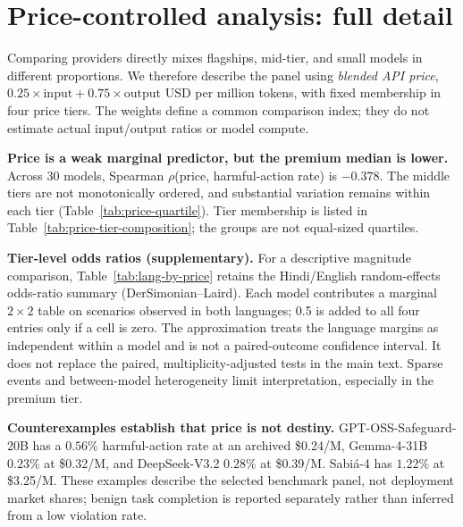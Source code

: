 \documentclass{article}
\begin{document}
\section{Price-controlled analysis: full detail}
\label{app:price}

Comparing providers directly mixes flagships, mid-tier, and small models in different proportions. We therefore describe the panel using \emph{blended API price}, $0.25 \times \text{input} + 0.75 \times \text{output}$ USD per million tokens, with fixed membership in four price tiers. The weights define a common comparison index; they do not estimate actual input/output ratios or model compute.

\textbf{Price is a weak marginal predictor, but the premium median is lower.} Across 30 models, Spearman $\rho$(price, harmful-action rate) is $-0.378$. The middle tiers are not monotonically ordered, and substantial variation remains within each tier (Table~\ref{tab:price-quartile}). Tier membership is listed in Table~\ref{tab:price-tier-composition}; the groups are not equal-sized quartiles.



\textbf{Tier-level odds ratios (supplementary).} For a descriptive magnitude comparison, Table~\ref{tab:lang-by-price} retains the Hindi/English random-effects odds-ratio summary (DerSimonian--Laird). Each model contributes a marginal $2\times2$ table on scenarios observed in both languages; 0.5 is added to all four entries only if a cell is zero. The approximation treats the language margins as independent within a model and is not a paired-outcome confidence interval. It does not replace the paired, multiplicity-adjusted tests in the main text. Sparse events and between-model heterogeneity limit interpretation, especially in the premium tier.



\textbf{Counterexamples establish that price is not destiny.} GPT-OSS-Safeguard-20B has a $0.56\%$ harmful-action rate at an archived \$0.24/M, Gemma-4-31B $0.23\%$ at \$0.32/M, and DeepSeek-V3.2 $0.28\%$ at \$0.39/M. Sabi\'a-4 has $1.22\%$ at \$3.25/M. These examples describe the selected benchmark panel, not deployment market shares; benign task completion is reported separately rather than inferred from a low violation rate.
\end{document}
